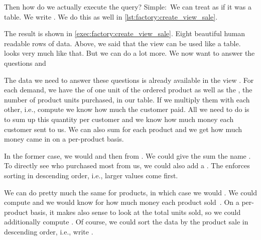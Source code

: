 Then how do we actually execute the query?
Simple:~We can treat  as if it was a table.
We write .
We do this as well in \cref{lst:factory:create_view_sale}.

The result is shown in \cref{exec:factory:create_view_sale}.
Eight beautiful human readable rows of data.%
%
\FloatBarrier%
\endhsection%
%
%
%
%
%
%
%
%
%
Above, we said that the view  can be used like a table.
 looks very much like that.
But we can do a lot more.
We now want to answer the questions  and 

The data we need to answer these questions is already available in the view .
For each demand, we have the  of one unit of the ordered product as well as the , the number of product units purchased, in our table.
If we multiply them with each other, i.e., compute  we know how much the customer paid.
All we need to do is to sum up this quantity per customer and we know how much money each customer sent to us.
We can also sum  for each product and we get how much money came in on a per-product basis.%
%
\begin{sloppypar}%
In the former case, we would  and then  from .
We could give the sum the name .
To directly see who purchased most from us, we could also add a .
The  enforces sorting in descending order, i.e., larger values come first.%
\end{sloppypar}%
%
We can do pretty much the same for products, in which case we would .
We could compute  and we would know for how much money each product sold~\cite{PGDG:PD:AF}.
On a per-product basis, it makes also sense to look at the total units sold, so we could additionally compute .
Of course, we could sort the data by the product sale in descending order, i.e., write .

